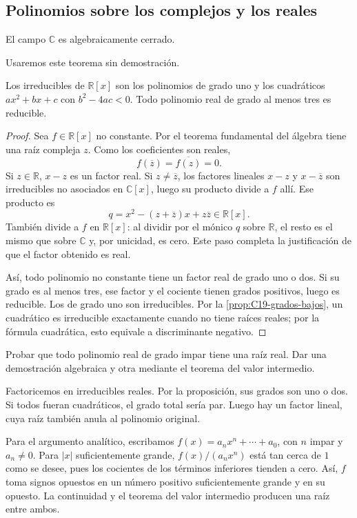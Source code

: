 \subsection{Polinomios sobre los complejos y los reales}
\begin{teo}\label{teo:C19-TFA}
El campo $\mathbb C$ es algebraicamente cerrado.
\end{teo}
Usaremos este teorema sin demostración.

\begin{prop}\label{prop:C19-reales}
Los irreducibles de $\mathbb R[x]$ son los polinomios de grado uno y los cuadráticos $ax^2+bx+c$ con $b^2-4ac<0$. Todo polinomio real de grado al menos tres es reducible.
\end{prop}
\begin{proof}
Sea $f\in\mathbb R[x]$ no constante. Por el teorema fundamental del álgebra tiene una raíz compleja $z$. Como los coeficientes son reales,
\[
f(\overline z)=\overline{f(z)}=0.
\]
Si $z\in\mathbb R$, $x-z$ es un factor real. Si $z\ne\overline z$, los factores lineales $x-z$ y $x-\overline z$ son irreducibles no asociados en $\mathbb C[x]$, luego su producto divide a $f$ allí. Ese producto es
\[
q=x^2-(z+\overline z)x+z\overline z\in\mathbb R[x].
\]
También divide a $f$ en $\mathbb R[x]$: al dividir por el mónico $q$ sobre $\mathbb R$, el resto es el mismo que sobre $\mathbb C$ y, por unicidad, es cero. Este paso completa la justificación de que el factor obtenido es real.

Así, todo polinomio no constante tiene un factor real de grado uno o dos. Si su grado es al menos tres, ese factor y el cociente tienen grados positivos, luego es reducible. Los de grado uno son irreducibles. Por la \cref{prop:C19-grados-bajos}, un cuadrático es irreducible exactamente cuando no tiene raíces reales; por la fórmula cuadrática, esto equivale a discriminante negativo.
\end{proof}

\begin{ejer}\label{ejer:C19-impar}
Probar que todo polinomio real de grado impar tiene una raíz real. Dar una demostración algebraica y otra mediante el teorema del valor intermedio.
\end{ejer}
\begin{sol}
Factoricemos en irreducibles reales. Por la proposición, sus grados son uno o dos. Si todos fueran cuadráticos, el grado total sería par. Luego hay un factor lineal, cuya raíz también anula al polinomio original.

Para el argumento analítico, escribamos $f(x)=a_nx^n+\cdots+a_0$, con $n$ impar y $a_n\ne0$. Para $|x|$ suficientemente grande, $f(x)/(a_nx^n)$ está tan cerca de $1$ como se desee, pues los cocientes de los términos inferiores tienden a cero. Así, $f$ toma signos opuestos en un número positivo suficientemente grande y en su opuesto. La continuidad y el teorema del valor intermedio producen una raíz entre ambos.
\end{sol}

